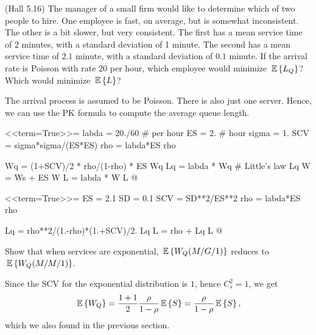 \begin{question}
  (Hall 5.16) The manager of a small firm would like to determine
  which of two people to hire. One employee is fast, on average, but
  is somewhat inconsistent. The other is a bit slower, but very
  consistent. The first has a mean service time of $2$ minutes, with a
  standard deviation of 1 minute. The second has a mean service time
  of $2.1$ minute, with a standard deviation of $0.1$ minute. If the arrival rate is Poisson with rate 20 per hour, which employee would minimize $\,\mathbb{E}\left\{L_Q\right\}$? Which would minimize $\,\mathbb{E}\left\{L\right\}$? 

  \begin{solution}
    
    The arrival process is assumed to be Poisson. There is also
    just one server. Hence, we can use the PK formula to compute the average queue length.

<<term=True>>=
labda = 20./60 # per hour
ES = 2. # hour
sigma = 1.
SCV = sigma*sigma/(ES*ES)
rho = labda*ES
rho

Wq = (1+SCV)/2 * rho/(1-rho) * ES
Wq
Lq = labda * Wq # Little's law
Lq
W = Ws + ES
W
L = labda * W
L
@ 


<<term=True>>=
ES = 2.1
SD = 0.1
SCV = SD**2/ES**2
rho = labda*ES
rho

Lq = rho**2/(1.-rho)*(1.+SCV)/2.
Lq
L = rho + Lq
L
@ 

  \end{solution}

\end{question}

\begin{question}
  Show that when services are exponential, $\,\mathbb{E}\left\{W_Q(M/G/1)\right\}$ reduces to
    $\,\mathbb{E}\left\{W_Q(M/M/1)\right\}$.
    \begin{solution}
      Since the SCV for the exponential distribution is $1$, hence
      $C_s^2=1$, we get 
    \begin{equation*}
\,\mathbb{E}\left\{W_Q\right\} = \frac{1+1}2\frac{\rho}{1-\rho} \,\mathbb{E}\left\{S\right\} = \frac{\rho}{1-\rho} \,\mathbb{E}\left\{S\right\},
    \end{equation*}
which we also found in the previous section.
    \end{solution}
\end{question}


